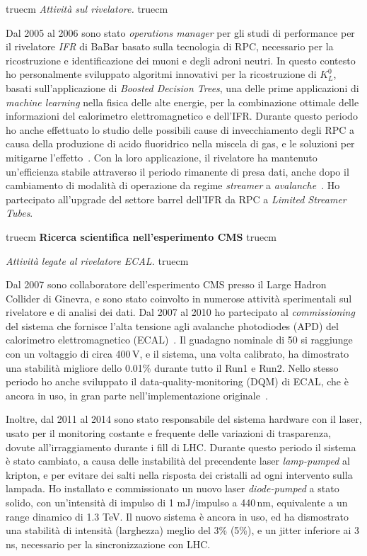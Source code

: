 \documentclass[11pt,twoside,a4paper]{article}
\begin{document}
 truecm
\textit{Attivit\`a sul rivelatore.}
 truecm

Dal 2005 al 2006 sono stato \textit{operations manager} per gli studi
di performance per il rivelatore \textit{IFR} di BaBar basato sulla
tecnologia di RPC, necessario per la ricostruzione e identificazione
dei muoni e degli adroni neutri. In questo contesto ho personalmente
sviluppato algoritmi innovativi per la ricostruzione di $K^0_L$,
basati sull'applicazione di \textit{Boosted Decision Trees}, una delle
prime applicazioni di \textit{machine learning} nella fisica delle
alte energie, per la combinazione ottimale delle informazioni del
calorimetro elettromagnetico e dell'IFR. Durante questo periodo ho
anche effettuato lo studio delle possibili cause di invecchiamento
degli RPC a causa della produzione di acido fluoridrico nella miscela
di gas, e le soluzioni per mitigarne
l'effetto~\cite{Band:2008zza}. Con la loro applicazione, il rivelatore
ha mantenuto un'efficienza stabile attraverso il periodo rimanente di
presa dati, anche dopo il cambiamento di modalit\`a di operazione da
regime \textit{streamer} a
\textit{avalanche}~\cite{Band:2006ig,Anulli:2005wi}. Ho partecipato
all'upgrade del settore barrel dell'IFR da RPC a \textit{Limited
  Streamer Tubes}.

 truecm
{\bf{Ricerca scientifica nell'esperimento CMS}}
 truecm

\textit{Attivit\`a legate al rivelatore ECAL.}
 truecm

Dal 2007 sono collaboratore dell'esperimento CMS presso il Large
Hadron Collider di Ginevra, e sono stato coinvolto in numerose
attivit\`a sperimentali sul rivelatore e di analisi dei dati. Dal 2007
al 2010 ho partecipato al \textit{commissioning} del sistema che
fornisce l'alta tensione agli avalanche photodiodes (APD) del
calorimetro elettromagnetico (ECAL)~\cite{Bartoloni_2013}. Il guadagno
nominale di 50 si raggiunge con un voltaggio di circa 400\,V, e il
sistema, una volta calibrato, ha dimostrato una stabilit\`a migliore
dello 0.01\% durante tutto il Run1 e Run2.  Nello stesso periodo ho
anche sviluppato il data-quality-monitoring (DQM) di ECAL, che \`e
ancora in uso, in gran parte nell'implementazione
originale~\cite{DiMarco:2009zz}.

Inoltre, dal 2011 al 2014 sono stato responsabile del sistema hardware
con il laser, usato per il monitoring costante e frequente delle
variazioni di trasparenza, dovute all'irraggiamento durante i fill di
LHC. Durante questo periodo il sistema \`e stato cambiato, a causa
delle instabilit\`a del precendente laser \textit{lamp-pumped} al
kripton, e per evitare dei salti nella risposta dei cristalli ad ogni
intervento sulla lampada. Ho installato e commissionato un nuovo laser
\textit{diode-pumped} a stato solido, con un'intensit\`a di impulso di
1 mJ/impulso a 440\,nm, equivalente a un range dinamico di 1.3 TeV. Il
nuovo sistema \`e ancora in uso, ed ha dismostrato una stabilit\`a di
intensit\`a (larghezza) meglio del 3\% (5\%), e un jitter inferiore ai
3\,ns, necessario per la sincronizzazione con LHC.
\end{document}
